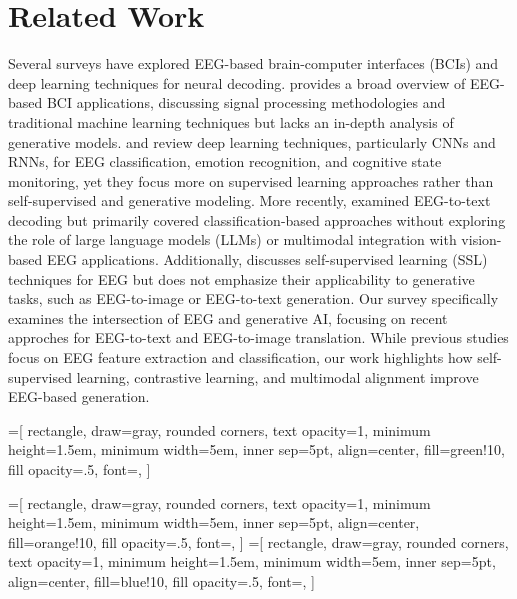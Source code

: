 \section{Related Work}
\label{sec:relwork}

Several surveys have explored EEG-based brain-computer interfaces (BCIs) and deep learning techniques for neural decoding. \cite{chen2022toward} provides a broad overview of EEG-based BCI applications, discussing signal processing methodologies and traditional machine learning techniques but lacks an in-depth analysis of generative models. \cite{gong2021deep} and \cite{weng2024self} review deep learning techniques, particularly CNNs and RNNs, for EEG classification, emotion recognition, and cognitive state monitoring, yet they focus more on supervised learning approaches rather than self-supervised and generative modeling. More recently, \cite{murad2024unveiling} examined EEG-to-text decoding but primarily covered classification-based approaches without exploring the role of large language models (LLMs) or multimodal integration with vision-based EEG applications. Additionally, \cite{sun2023survey} discusses self-supervised learning (SSL) techniques for EEG but does not emphasize their applicability to generative tasks, such as EEG-to-image or EEG-to-text generation. Our survey specifically examines the intersection of EEG and generative AI, focusing on recent approches for EEG-to-text and EEG-to-image translation. While previous studies focus on EEG feature extraction and classification, our work highlights how self-supervised learning, contrastive learning, and multimodal alignment improve EEG-based generation.




=[
    rectangle,
    draw=gray,
    rounded corners,
    text opacity=1,
    minimum height=1.5em,
    minimum width=5em,
    inner sep=5pt,
    align=center,
    fill=green!10,
    fill opacity=.5,
    font=\small,
]

=[
    rectangle,
    draw=gray,
    rounded corners,
    text opacity=1,
    minimum height=1.5em,
    minimum width=5em,
    inner sep=5pt,
    align=center,
    fill=orange!10,
    fill opacity=.5,
    font=\small,
]
=[
    rectangle,
    draw=gray,
    rounded corners,
    text opacity=1,
    minimum height=1.5em,
    minimum width=5em,
    inner sep=5pt,
    align=center,
    fill=blue!10,
    fill opacity=.5,
    font=\small,
]
    
